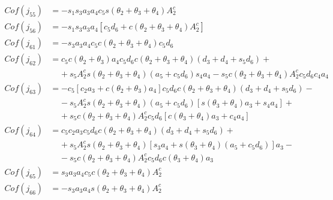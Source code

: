 \begin{align*}
    Cof(j_{55}) &= -s_1s_3a_3a_4c_5s(\theta_2+\theta_3+\theta_4)A_2^c \\
    Cof(j_{56}) &= -s_1s_3a_3a_4[c_5d_6+c(\theta_2+\theta_3+\theta_4)A_2^c] \\    
    Cof(j_{61}) &= -s_3a_3a_4c_5c(\theta_2+\theta_3+\theta_4)c_5d_6 \\
    Cof(j_{62}) &= c_5c(\theta_2+\theta_3)a_4c_5d_6c(\theta_2+\theta_3+\theta_4)(d_3+d_4+s_5d_6)+ \\
                    & \;\;\;\; +\!s_5A_2^cs(\theta_2+\theta_3+\theta_4)(a_5+c_5d_6)s_4a_4 - s_5c(\theta_2+\theta_3+\theta_4)A_2^cc_5d_6c_4a_4 \\
    Cof(j_{63}) &= -c_5[c_2a_3+c(\theta_2+\theta_3)a_4]c_5d_6c(\theta_2+\theta_3+\theta_4)(d_3+d_4+s_5d_6)- \\
                    & \;\;\;\; -\!s_5A_2^cs(\theta_2+\theta_3+\theta_4)(a_5+c_5d_6)[s(\theta_3+\theta_4)a_3+s_4a_4] + \\
                    & \;\;\;\; +\!s_5c(\theta_2+\theta_3+\theta_4)A_2^cc_5d_6[c(\theta_3+\theta_4)a_3+c_4a_4] \\     
    Cof(j_{64}) &= c_5c_2a_3c_5d_6c(\theta_2+\theta_3+\theta_4)(d_3+d_4+s_5d_6)+ \\
                    & \;\;\;\; +\!s_5A_2^cs(\theta_2+\theta_3+\theta_4)[s_3a_4+s(\theta_3+\theta_4)(a_5+c_5d_6)]a_3 - \\
                    & \;\;\;\; -\!s_5c(\theta_2+\theta_3+\theta_4)A_2^cc_5d_6c(\theta_3+\theta_4)a_3 \\       
    Cof(j_{65}) &= s_3a_3a_4c_5c(\theta_2+\theta_3+\theta_4)A_2^c \\
    Cof(j_{66}) &= -s_3a_3a_4s(\theta_2+\theta_3+\theta_4)A_2^c \\                                                         
\end{align*}